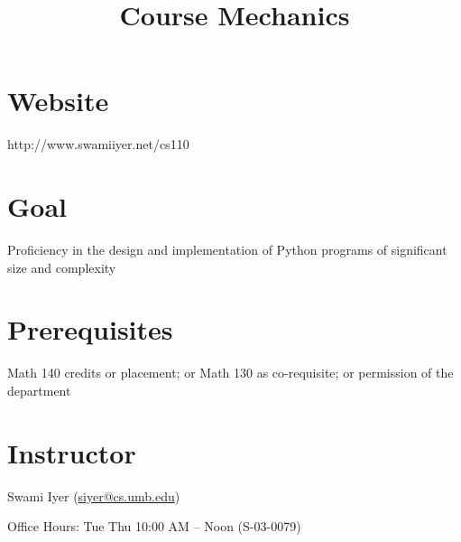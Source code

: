 \documentclass[8pt,a4paper,compress]{beamer}
\title{Course Mechanics}
\date{}
\begin{document}
\begin{frame}
\vfill
\titlepage
\end{frame}

\section{Website}
\begin{frame}[fragile]
\pause

http://www.swamiiyer.net/cs110
\end{frame}

\section{Goal}
\begin{frame}[fragile]
\pause

Proficiency in the design and implementation of Python programs of significant size and complexity
\end{frame}

\section{Prerequisites}
\begin{frame}[fragile]
\pause

Math 140 credits or placement; or Math 130 as co-requisite; or permission of the department
\end{frame}

\section{Instructor}
\begin{frame}[fragile]
\pause

Swami Iyer (\href{siyer@cs.umb.edu}{siyer@cs.umb.edu})

\pause\bigskip

Office Hours: Tue Thu 10:00 AM -- Noon (S-03-0079)
\end{frame}
\end{document}
